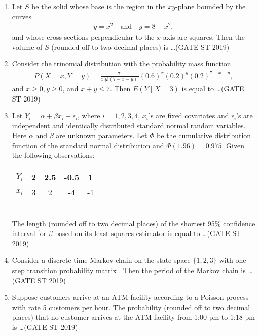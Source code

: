 \documentclass[journal]{IEEEtran}
\begin{document}
\begin{enumerate}[start=1]
\item Let \(S\) be the solid whose base is the region in the \(xy\)-plane bounded by the curves
\begin{align*}
y = x^2 \quad \text{and} \quad y = 8 - x^2,
\end{align*}
and whose cross-sections perpendicular to the \(x\)-axis are squares. Then the volume of \(S\) (rounded off to two decimal places) is \ldots \hfill(GATE ST 2019)

\item Consider the trinomial distribution with the probability mass function
\begin{align*}
P(X = x, Y= y) = \frac{7!}{x! y! (7 - x - y)!} (0.6)^x (0.2)^y (0.2)^{7 - x - y},
\end{align*} and \(x \geq 0, y \geq 0\), and \(x + y \leq 7\).
Then \(E(Y \mid X = 3)\) is equal to \ldots \hfill(GATE ST 2019)

\item Let \(Y_i = \alpha + \beta x_i + \epsilon_i\), where \(i = 1, 2, 3, 4\), \(x_i\)'s are fixed covariates and \(\epsilon_i\)'s are independent and identically distributed standard normal random variables. Here \(\alpha\) and \(\beta\) are unknown parameters. Let \(\Phi\) be the cumulative distribution function of the standard normal distribution and \(\Phi(1.96) = 0.975\). Given the following observations: \\
\begin{tabular}{|c|c|c|c|c|}
\hline
$Y_i$ & 2 & 2.5 & -0.5 & 1 \\
\hline
$x_i$ & 3 & 2 & -4 & -1 \\
\hline
\end{tabular}\\
The length (rounded off to two decimal places) of the shortest 95\% confidence interval for \(\beta\) based on its least squares estimator is equal to \ldots \hfill(GATE ST 2019)

\item Consider a discrete time Markov chain on the state space \(\{1,2,3\}\) with one-step transition probability matrix
.
Then the period of the Markov chain is \ldots \hfill(GATE ST 2019)

\item Suppose customers arrive at an ATM facility according to a Poisson process with rate 5 customers per hour. The probability (rounded off to two decimal places) that no customer arrives at the ATM facility from 1:00 pm to 1:18 pm is \ldots \hfill(GATE ST 2019)


\end{enumerate}
\end{document}
